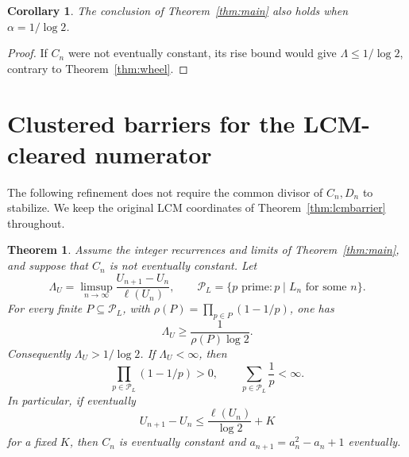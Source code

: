 \documentclass[11pt]{article}
\newtheorem{theorem}{Theorem}
\newtheorem{corollary}{Corollary}
\newcommand{\ellog}{\ell}
\begin{document}
\begin{corollary}\label{cor:endpoint}
The conclusion of Theorem~\ref{thm:main} also holds when
$\alpha=1/\log2$.
\end{corollary}
\begin{proof}
If $C_n$ were not eventually constant, its rise bound would give
$\Lambda\le1/\log2$, contrary to Theorem~\ref{thm:wheel}.
\end{proof}

\section{Clustered barriers for the LCM-cleared numerator}
The following refinement does not require the common divisor of $C_n,D_n$
to stabilize. We keep the original LCM coordinates of
Theorem~\ref{thm:lcmbarrier} throughout.

\begin{theorem}\label{thm:lcmwheel}
Assume the integer recurrences and limits of Theorem~\ref{thm:main},
and suppose that $C_n$ is not eventually constant. Let
\[
 \Lambda_U=\limsup_{n\to\infty}
 \frac{U_{n+1}-U_n}{\ellog(U_n)},\qquad
 \mathcal P_L=\{p\text{ prime}:p\mid L_n\text{ for some }n\}.
\]
For every finite $P\subseteq\mathcal P_L$, with
$\rho(P)=\prod_{p\in P}(1-1/p)$, one has
\[
 \Lambda_U\ge\frac1{\rho(P)\log2}.
\]
Consequently $\Lambda_U>1/\log2$. If $\Lambda_U<\infty$, then
\[
 \prod_{p\in\mathcal P_L}(1-1/p)>0,
 \qquad \sum_{p\in\mathcal P_L}\frac1p<\infty.
\]
In particular, if eventually
\[
 U_{n+1}-U_n\le\frac{\ellog(U_n)}{\log2}+K
\]
for a fixed $K$, then $C_n$ is eventually constant and
$a_{n+1}=a_n^2-a_n+1$ eventually.
\end{theorem}
\end{document}
